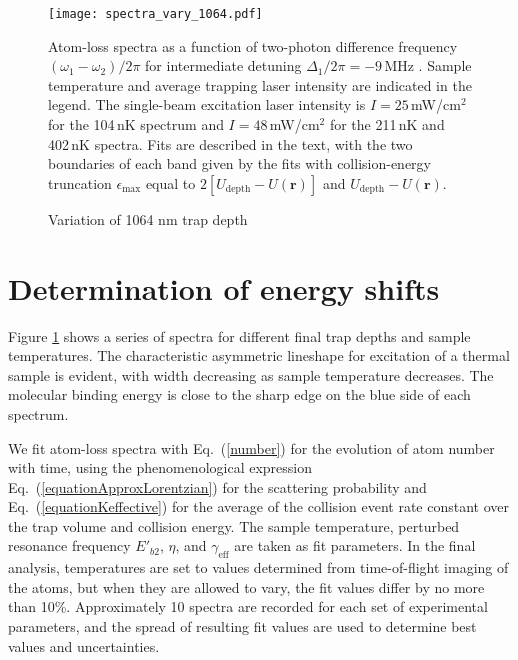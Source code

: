 \begin{figure} \label{Fig:Spectraminus9MHzVaryTrapCold}
\centerline{
  \texttt{[image: spectra\_vary\_1064.pdf]}}
  \caption{Variation of 1064 nm trap depth}{Atom-loss spectra as a function of two-photon difference frequency $(\omega_1-\omega_2)/2\pi$ for intermediate detuning
$\Delta_1/2\pi=-9$\,MHz . Sample temperature and average trapping laser intensity are indicated in the legend. The single-beam excitation laser intensity is $I=25$\,mW/cm$^{2}$ for the 104\,nK spectrum and $I=48$\,mW/cm$^{2}$ for the 211\,nK and 402\,nK spectra. Fits are described in the text, with the two boundaries of each band given by the fits with collision-energy truncation
$\epsilon_{\text{max}}$ equal to $2[U_{\text{depth}}-U(\mathbf{r})]$ and $U_{\text{depth}}-U(\mathbf{r})$.}
\end{figure}

\section{Determination of energy shifts}
\label{sec:lowE_Eb2}


Figure \ref{Fig:Spectraminus9MHzVaryTrapCold} shows a series of spectra for different final trap depths and sample temperatures. The characteristic asymmetric lineshape for excitation of a thermal sample is evident, with width decreasing as sample temperature decreases. The molecular binding energy is close to the sharp edge on the blue side of each spectrum.

We fit atom-loss spectra with Eq.\ (\ref{number}) for the evolution of atom number with time, using the phenomenological expression Eq.\ (\ref{equationApproxLorentzian}) for the scattering probability and Eq.\ (\ref{equationKeffective}) for the average of the collision event rate constant over the trap volume and collision energy. The sample temperature, perturbed resonance frequency $E'_{b2}$, $\eta$, and $\gamma_{\text{eff}}$ are taken as fit parameters. In the final analysis, temperatures are set to values determined from time-of-flight imaging of the atoms, but when they are allowed to vary, the fit values differ by no more than 10\%. Approximately 10 spectra are recorded for each set of experimental parameters, and the spread of resulting fit values are used to determine best values and uncertainties.


